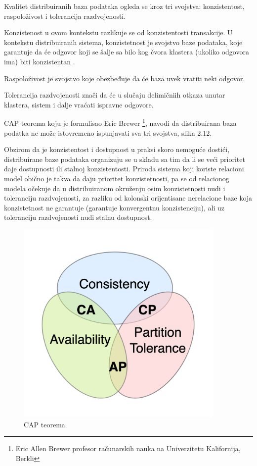 \documentclass[12pt,oneside]{memoir}
\begin{document}
Kvalitet distribuiranih baza podataka ogleda se kroz tri svojstva: konzistentost, raspoloživost i tolerancija razdvojenosti.

Konzistenost u ovom kontekstu razlikuje se od konzistentosti transakcije. U kontekstu distribuiranih sistema, konzistetnost je svojstvo baze podataka, koje garantuje da će odgovor koji se šalje sa bilo kog čvora klastera (ukoliko odgovora ima) biti konzistentan .

Raspoloživost je svojstvo koje obezbeđuje da će baza uvek vratiti neki odgovor.

Tolerancija razdvojenosti znači da će u slučaju delimičniih otkaza unutar klastera, sistem i dalje vraćati ispravne odgovore.

CAP teorema koju je formulisao Eric Brewer  \footnote{Eric Allen Brewer profesor računarskih nauka na Univerzitetu Kalifornija, Berkli}, navodi da distribuirana baza podatka ne može istovremeno ispunjavati sva tri svojstva, slika 2.12.

Obzirom da je konzistentost i dostupnost u praksi skoro nemoguće dostići, distribuirane baze podataka organizuju se u skladu sa tim da li se veći prioritet daje dostupnosti ili stalnoj konzistentosti. Priroda sistema koji koriste relacioni model obično je takva da  daju prioritet konzistetnosti, pa se od relacionog modela očekuje da u distribuiranom okruženju osim konzistetnosti nudi i toleranciju razdvojenosti, za razliku od kolonski orijentisane nerelacione baze koja konzistetnost ne garantuje (garantuje konvergentnu konzistenciju), ali uz toleranciju razdvojenosti nudi stalnu dostupnost.

\begin{figure}[!ht]
  \centering
  \includegraphics[width=0.9\textwidth]{cap.png}
  \caption{CAP teorema}
  \label{fig:grafikon}
\end{figure}
\end{document}

